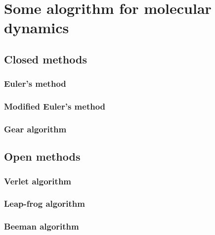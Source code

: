 
\section{Some alogrithm for molecular dynamics}

\subsection{Closed methods}

\subsubsection{Euler's method}

\subsubsection{Modified Euler's method}

\subsubsection{Gear algorithm}


\subsection{Open methods}

\subsubsection{Verlet algorithm}

\subsubsection{Leap-frog algorithm}

\subsubsection{Beeman algorithm}
